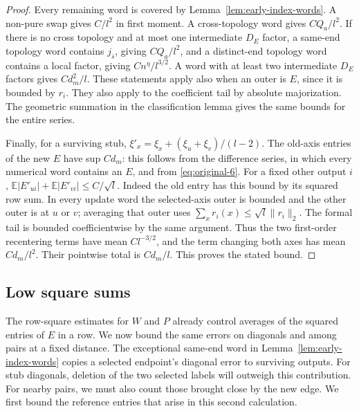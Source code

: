 \begin{proof}
Every remaining word is covered by Lemma~\ref{lem:early-index-words}.
A non-pure swap gives \(C/l^2\) in first moment. A cross-topology
word gives \(CQ_a/l^2\). If there is no cross topology and at most
one intermediate \(D_E\) factor, a same-end topology word contains
\(j_{\bar s}\), giving \(CQ_a/l^2\), and a distinct-end topology
word contains a local factor, giving \(Cn^\eta/l^{3/2}\).
A word with at least two intermediate \(D_E\) factors gives
\(Cd_m^2/l\). These statements apply also when an outer is \(E\),
since it is bounded by \(r_i\). They also apply to the coefficient
tail by absolute majorization. The geometric summation in the
classification lemma gives the same bounds for the entire series.

Finally, for a surviving stub,
\(\xi'_x=\xi_x+(\xi_u+\xi_v)/(l-2)\).
The old-axis entries of the new \(E\) have sup \(Cd_m\): this
follows from the difference series, in which every numerical word
contains an \(E\), and from \eqref{eq:original-6}. For a fixed
other output \(i\),
\(\mathbb E|E'_{ui}|+\mathbb E|E'_{vi}|\le C/\sqrt l\).
Indeed the old entry has this bound by its squared row sum. In every
update word the selected-axis outer is bounded and the other outer
is at \(u\) or \(v\); averaging that outer uses
\(\sum_xr_i(x)\le\sqrt l\|r_i\|_2\).
The formal tail is bounded coefficientwise by the same argument.
Thus the two first-order recentering terms have mean
\(Cl^{-3/2}\), and the term changing both axes has mean
\(Cd_m/l^2\). Their pointwise total is \(Cd_m/l\).
This proves the stated bound.
\end{proof}

\subsection{Low square sums}

The row-square estimates for \(W\) and \(P\) already control averages
of the squared entries of \(E\) in a row. We now bound the same errors
on diagonals and among pairs at a fixed distance. The exceptional same-end
word in Lemma~\ref{lem:early-index-words} copies a selected endpoint's
diagonal error to surviving outputs. For stub diagonals, deletion of the
two selected labels will outweigh this contribution. For nearby pairs,
we must also count those brought close by the new edge. We first bound
the reference entries that arise in this second calculation.

